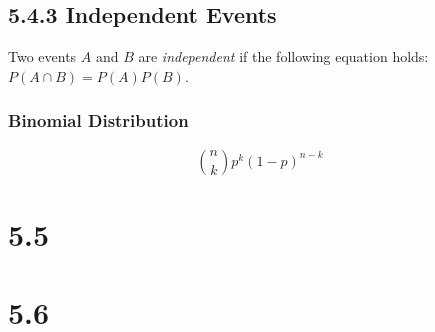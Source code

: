 \documentclass[10pt,twocolumn]{article}
\begin{document}
	\subsection*{5.4.3 Independent Events}
	
	Two events $A$ and $B$ are \emph{independent} if the following equation holds: $P(A \cap B)=P(A)P(B)$.
	
	\subsubsection*{Binomial Distribution}
	
	\[\binom{n}{k}p^k(1-p)^{n-k}\]
	
	\section*{5.5}
	
	\section*{5.6}
	
\end{document}
